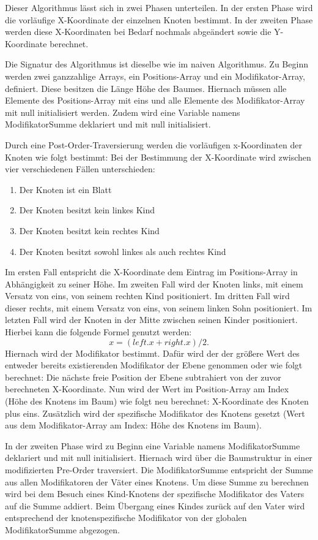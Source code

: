 Dieser Algorithmus lässt sich in zwei Phasen unterteilen. In der ersten Phase wird die vorläufige X-Koordinate der einzelnen Knoten bestimmt.
In der zweiten Phase werden diese X-Koordinaten bei Bedarf nochmals abgeändert sowie die Y-Koordinate berechnet.

Die Signatur des Algorithmus ist dieselbe wie im naiven Algorithmus. Zu Beginn werden zwei
ganzzahlige Arrays, ein Positions-Array und ein Modifikator-Array, definiert. Diese besitzen die Länge \glqq Höhe des Baumes\grqq{}.
Hiernach müssen alle Elemente des Positions-Array mit eins und alle Elemente des Modifikator-Array mit null initialisiert werden.
Zudem wird eine Variable namens \glqq ModifikatorSumme\grqq{} deklariert und mit null initialisiert.

Durch eine Post-Order-Traversierung werden die vorläufigen x-Koordinaten der Knoten wie folgt bestimmt:
Bei der Bestimmung der X-Koordinate wird zwischen vier verschiedenen Fällen unterschieden:
\begin{enumerate}
	\item Der Knoten ist ein Blatt
	\item Der Knoten besitzt kein linkes Kind
	\item Der Knoten besitzt kein rechtes Kind
	\item Der Knoten besitzt sowohl linkes als auch rechtes Kind
\end{enumerate}

Im ersten Fall entspricht die X-Koordinate dem Eintrag im Positions-Array in Abhängigkeit zu seiner Höhe.
Im zweiten Fall wird der Knoten links, mit einem Versatz von eins, von seinem rechten Kind positioniert.
Im dritten Fall wird dieser rechts, mit einem Versatz von eins, von seinem linken Sohn positioniert. Im letzten Fall wird der Knoten
in der Mitte zwischen seinen Kinder positioniert. Hierbei kann die folgende Formel genutzt werden: $$x = (left.x + right.x) / 2.$$
Hiernach wird der Modifikator bestimmt. Dafür wird der der größere Wert des entweder bereits existierenden Modifikator der Ebene genommen
oder wie folgt berechnet: Die nächste freie Position der Ebene subtrahiert von der zuvor berechneten X-Koordinate.
Nun wird der Wert im Position-Array am Index (Höhe des Knotens im Baum) wie folgt neu berechnet:
X-Koordinate des Knoten plus eins. Zusätzlich wird der spezifische Modifikator des Knotens gesetzt
(Wert aus dem Modifikator-Array am Index: Höhe des Knotens im Baum).

In der zweiten Phase wird zu Beginn eine Variable namens \glqq ModifikatorSumme\grqq{} deklariert und mit null initialisiert.
Hiernach wird über die Baumstruktur in einer modifizierten Pre-Order traversiert. Die ModifikatorSumme entspricht
der Summe aus allen Modifikatoren der Väter eines Knotens. Um diese Summe zu berechnen wird bei dem Besuch eines Kind-Knotens
der spezifische Modifikator des Vaters auf die Summe addiert. Beim Übergang eines Kindes zurück auf den Vater wird entsprechend
der knotenspezifische Modifikator von der globalen ModifikatorSumme abgezogen.

